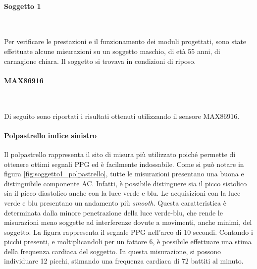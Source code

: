 \clearpage

\paragraph{Soggetto 1}~

Per verificare le prestazioni e il funzionamento dei moduli progettati, sono state effettuate alcune misurazioni su un soggetto maschio, di età 55 anni, di carnagione chiara. Il soggetto si trovava in condizioni di riposo.

\paragraph{MAX86916}~

Di seguito sono riportati i risultati ottenuti utilizzando il sensore MAX86916.

\paragraph{Polpastrello indice sinistro}

Il polpastrello rappresenta il sito di misura più utilizzato poiché permette di ottenere ottimi segnali PPG ed è facilmente indossabile. Come si può notare in figura \ref{fig:soggetto1_polpastrello}, tutte le misurazioni presentano una buona e distinguibile componente AC. Infatti, è possibile distinguere sia il picco sistolico sia il picco diastolico anche con la luce verde e blu. Le acquisizioni con la luce verde e blu presentano un andamento più \textit{smooth}. Questa caratteristica è determinata dalla minore penetrazione della luce verde-blu, che rende le misurazioni meno soggette ad interferenze dovute a movimenti, anche minimi, del soggetto. La figura rappresenta il segnale PPG nell'arco di 10 secondi. Contando i picchi presenti, e moltiplicandoli per un fattore 6, è possibile effettuare una stima della frequenza cardiaca del soggetto. In questa misurazione, si possono individuare 12 picchi, stimando una frequenza cardiaca di 72 battiti al minuto.

